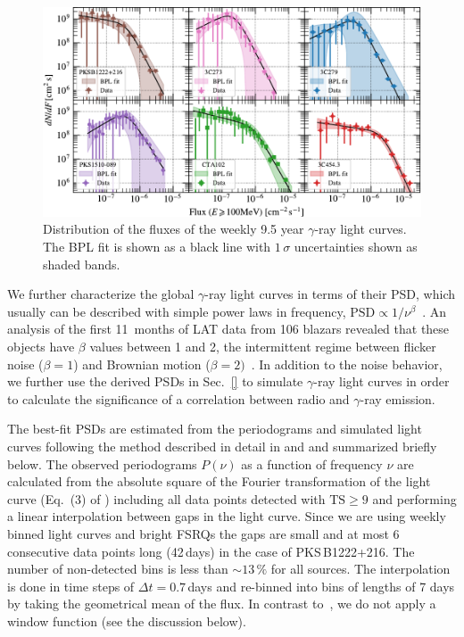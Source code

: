 \documentclass[twocolumn]{aastex62}
\newcommand{\gray}{$\gamma$-ray\xspace}
\begin{document}
\begin{figure}
    \includegraphics[width = .99\linewidth]{figures/fluxdist_weekly_tsmin9.pdf}
    \caption{\label{fig:fluxpdf} Distribution of the fluxes of the weekly 9.5 year \gray light curves. The BPL fit is shown as a black line with $1\,\sigma$ uncertainties shown as shaded bands.}
\end{figure}

We further characterize the global \gray light curves in terms of their PSD,
which usually can be described with simple power laws in frequency,  $\mathrm{PSD} \propto 1 / \nu^\beta$~\citep{}.
An analysis of the first 11~months of LAT data from 106 blazars revealed that 
these objects have $\beta$ values between 1 and 2, the intermittent regime between flicker noise ($\beta = 1$) and Brownian motion ($\beta = 2)$~\citep{2010ApJ...722..520A}. 
In addition to the noise behavior, 
we further use the derived PSDs in Sec.~\ref{} to simulate \gray light curves in order to calculate the significance of a correlation between radio and \gray emission. 

The best-fit PSDs are estimated from the periodograms and simulated light curves following the method described in detail in \citet{2014MNRAS.445..437M} and \citet{2013MNRAS.433..907E} and summarized briefly below.
The observed periodograms $P(\nu)$ as a function of frequency $\nu$ are calculated from the absolute square of the Fourier transformation of the light curve (Eq.~(3) of \citealt{2014MNRAS.445..437M}) including all 
data points detected with $\mathrm{TS} \geqslant 9$ and performing a linear interpolation between gaps in the light curve. Since we are using weekly binned light curves and bright FSRQs the gaps are small and at most 6 consecutive data points long (42\,days) in the case of PKS\,B1222+216. The number of non-detected bins is less than $\sim13\,\%$ for all sources.
The interpolation is done in time steps of $\Delta t=0.7\,$days and 
 re-binned into bins of lengths of 7 days by taking the geometrical mean of the flux.
In contrast to~\citet{2014MNRAS.445..437M}, we do not apply a window function (see the discussion below). 
\end{document}
